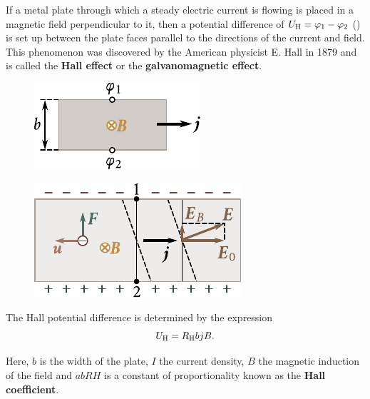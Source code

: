 If a metal plate through which a steady electric current is flowing is placed in a magnetic field perpendicular to it, then a potential difference of $U_{\text{H}} = \varphi_1 - \varphi_2$ () is set up between the plate faces parallel to the directions of the current and field.
This phenomenon was discovered by the American physicist E. Hall in 1879 and is called the \textbf{Hall effect} or the \textbf{galvanomagnetic effect}.

\begin{figure}[t]
	\begin{minipage}[t]{0.48\linewidth}
		\begin{center}
			\includegraphics[scale=1]{figures/ch_11/fig_11_2.pdf}
			\caption[]{}
			\label{fig:11_2}
		\end{center}
	\end{minipage}
	\hfill{ }%
	\begin{minipage}[t]{0.48\linewidth}
		\begin{center}
			\includegraphics[scale=1]{figures/ch_11/fig_11_3.pdf}
			\caption[]{}
			\label{fig:11_3}
		\end{center}
	\end{minipage}
\vspace{-0.4cm}
\end{figure}

The Hall potential difference is determined by the expression
\begin{equation}\label{eq:11_13}
    U_{\text{H}} = R_{\text{H}} b j B.
\end{equation}

\noindent
Here, $b$ is the width of the plate, $I$ the current density, $B$ the magnetic induction of the field and $ab{R}{H}$ is a constant of proportionality known as the \textbf{Hall coefficient}.

